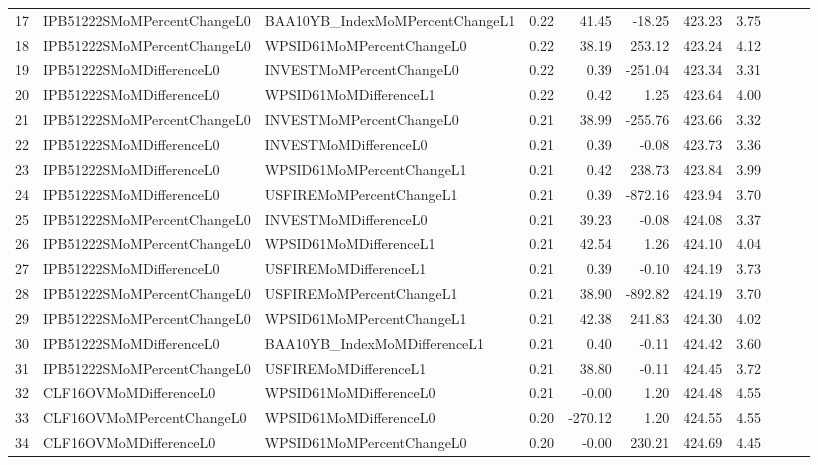\begin{longtable}{rllrrrrrlll}
  17 & IPB51222SMoMPercentChangeL0 & BAA10YB\_IndexMoMPercentChangeL1 & 0.22 & 41.45 & -18.25 & 423.23 & 3.75 &  &  &  \\ 
  18 & IPB51222SMoMPercentChangeL0 & WPSID61MoMPercentChangeL0 & 0.22 & 38.19 & 253.12 & 423.24 & 4.12 &  &  &  \\ 
  19 & IPB51222SMoMDifferenceL0 & INVESTMoMPercentChangeL0 & 0.22 & 0.39 & -251.04 & 423.34 & 3.31 &  &  &  \\ 
  20 & IPB51222SMoMDifferenceL0 & WPSID61MoMDifferenceL1 & 0.22 & 0.42 & 1.25 & 423.64 & 4.00 &  &  &  \\ 
  21 & IPB51222SMoMPercentChangeL0 & INVESTMoMPercentChangeL0 & 0.21 & 38.99 & -255.76 & 423.66 & 3.32 &  &  &  \\ 
  22 & IPB51222SMoMDifferenceL0 & INVESTMoMDifferenceL0 & 0.21 & 0.39 & -0.08 & 423.73 & 3.36 &  &  &  \\ 
  23 & IPB51222SMoMDifferenceL0 & WPSID61MoMPercentChangeL1 & 0.21 & 0.42 & 238.73 & 423.84 & 3.99 &  &  &  \\ 
  24 & IPB51222SMoMDifferenceL0 & USFIREMoMPercentChangeL1 & 0.21 & 0.39 & -872.16 & 423.94 & 3.70 &  &  &  \\ 
  25 & IPB51222SMoMPercentChangeL0 & INVESTMoMDifferenceL0 & 0.21 & 39.23 & -0.08 & 424.08 & 3.37 &  &  &  \\ 
  26 & IPB51222SMoMPercentChangeL0 & WPSID61MoMDifferenceL1 & 0.21 & 42.54 & 1.26 & 424.10 & 4.04 &  &  &  \\ 
  27 & IPB51222SMoMDifferenceL0 & USFIREMoMDifferenceL1 & 0.21 & 0.39 & -0.10 & 424.19 & 3.73 &  &  &  \\ 
  28 & IPB51222SMoMPercentChangeL0 & USFIREMoMPercentChangeL1 & 0.21 & 38.90 & -892.82 & 424.19 & 3.70 &  &  &  \\ 
  29 & IPB51222SMoMPercentChangeL0 & WPSID61MoMPercentChangeL1 & 0.21 & 42.38 & 241.83 & 424.30 & 4.02 &  &  &  \\ 
  30 & IPB51222SMoMDifferenceL0 & BAA10YB\_IndexMoMDifferenceL1 & 0.21 & 0.40 & -0.11 & 424.42 & 3.60 &  &  &  \\ 
  31 & IPB51222SMoMPercentChangeL0 & USFIREMoMDifferenceL1 & 0.21 & 38.80 & -0.11 & 424.45 & 3.72 &  &  &  \\ 
  32 & CLF16OVMoMDifferenceL0 & WPSID61MoMDifferenceL0 & 0.21 & -0.00 & 1.20 & 424.48 & 4.55 &  &  &  \\ 
  33 & CLF16OVMoMPercentChangeL0 & WPSID61MoMDifferenceL0 & 0.20 & -270.12 & 1.20 & 424.55 & 4.55 &  &  &  \\ 
  34 & CLF16OVMoMDifferenceL0 & WPSID61MoMPercentChangeL0 & 0.20 & -0.00 & 230.21 & 424.69 & 4.45 &  &  &  \\ 

\end{longtable}
